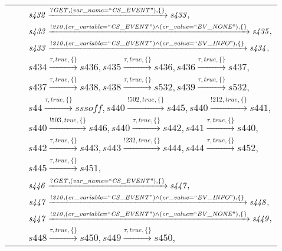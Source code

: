 \begin{tabular}{lcl}
& & $\mathit{s432}\xrightarrow{\mathit{?GET}, \mathit{(var\_name = ``CS\_EVENT")}, \{\}}\mathit{s433},$ \\
& & $\mathit{s433}\xrightarrow{\mathit{!210}, \mathit{(cr\_variable = ``CS\_EVENT") \land (cr\_value = ``EV\_NONE")}, \{\}}\mathit{s435},$ \\
& & $\mathit{s433}\xrightarrow{\mathit{!210}, \mathit{(cr\_variable = ``CS\_EVENT") \land (cr\_value = ``EV\_INFO")}, \{\}}\mathit{s434},$ \\
& & $\mathit{s434}\xrightarrow{\mathit{\tau}, \mathit{true}, \{\}}\mathit{s436},\mathit{s435}\xrightarrow{\mathit{\tau}, \mathit{true}, \{\}}\mathit{s436},\mathit{s436}\xrightarrow{\mathit{\tau}, \mathit{true}, \{\}}\mathit{s437},$ \\
& & $\mathit{s437}\xrightarrow{\mathit{\tau}, \mathit{true}, \{\}}\mathit{s438},\mathit{s438}\xrightarrow{\mathit{\tau}, \mathit{true}, \{\}}\mathit{s532},\mathit{s439}\xrightarrow{\mathit{\tau}, \mathit{true}, \{\}}\mathit{s532},$ \\
& & $\mathit{s44}\xrightarrow{\mathit{\tau}, \mathit{true}, \{\}}\mathit{sssoff},\mathit{s440}\xrightarrow{\mathit{!502}, \mathit{true}, \{\}}\mathit{s445},\mathit{s440}\xrightarrow{\mathit{!212}, \mathit{true}, \{\}}\mathit{s441},$ \\
& & $\mathit{s440}\xrightarrow{\mathit{!503}, \mathit{true}, \{\}}\mathit{s446},\mathit{s440}\xrightarrow{\mathit{\tau}, \mathit{true}, \{\}}\mathit{s442},\mathit{s441}\xrightarrow{\mathit{\tau}, \mathit{true}, \{\}}\mathit{s440},$ \\
& & $\mathit{s442}\xrightarrow{\mathit{\tau}, \mathit{true}, \{\}}\mathit{s443},\mathit{s443}\xrightarrow{\mathit{!232}, \mathit{true}, \{\}}\mathit{s444},\mathit{s444}\xrightarrow{\mathit{\tau}, \mathit{true}, \{\}}\mathit{s452},$ \\
& & $\mathit{s445}\xrightarrow{\mathit{\tau}, \mathit{true}, \{\}}\mathit{s451},$ \\
& & $\mathit{s446}\xrightarrow{\mathit{?GET}, \mathit{(var\_name = ``CS\_EVENT")}, \{\}}\mathit{s447},$ \\
& & $\mathit{s447}\xrightarrow{\mathit{!210}, \mathit{(cr\_variable = ``CS\_EVENT") \land (cr\_value = ``EV\_INFO")}, \{\}}\mathit{s448},$ \\
& & $\mathit{s447}\xrightarrow{\mathit{!210}, \mathit{(cr\_variable = ``CS\_EVENT") \land (cr\_value = ``EV\_NONE")}, \{\}}\mathit{s449},$ \\
& & $\mathit{s448}\xrightarrow{\mathit{\tau}, \mathit{true}, \{\}}\mathit{s450},\mathit{s449}\xrightarrow{\mathit{\tau}, \mathit{true}, \{\}}\mathit{s450},$ \\

\end{tabular}
